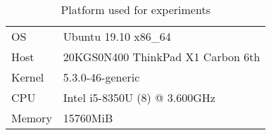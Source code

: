 \begin{table}[h]
    \centering
    \caption{Platform used for experiments}
    \begin{tabular}{ll}
        \hline
        OS     & Ubuntu 19.10 x86\_64              \\
        Host   & 20KGS0N400 ThinkPad X1 Carbon 6th \\
        Kernel & 5.3.0-46-generic                  \\
        CPU    & Intel i5-8350U (8) @ 3.600GHz     \\
        Memory & 15760MiB                          \\
        \hline
    \end{tabular}
    \label{table:laptop}
\end{table}